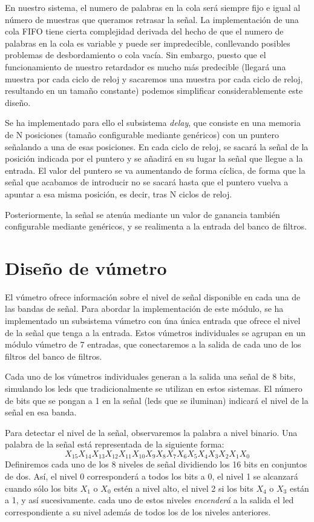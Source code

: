 \documentclass[a4paper,12pt]{article}
\begin{document}
En nuestro sistema, el numero de palabras en la cola será siempre fijo e igual al número de muestras que queramos retrasar la señal. La implementación de una cola FIFO tiene cierta complejidad derivada del hecho de que el numero de palabras en la cola es variable y puede ser impredecible, conllevando posibles problemas de desbordamiento o cola vacía. Sin embargo, puesto que el funcionamiento de nuestro retardador es mucho más predecible (llegará una muestra por cada ciclo de reloj y sacaremos una muestra por cada ciclo de reloj, resultando en un tamaño constante) podemos simplificar considerablemente este diseño.

Se ha implementado para ello el subsistema \emph{delay}, que consiste en una memoria de N posiciones (tamaño configurable mediante genéricos) con un puntero señalando a una de esas posiciones. En cada ciclo de reloj, se sacará la señal de la posición indicada por el puntero y se añadirá en su lugar la señal que llegue a la entrada. El valor del puntero se va aumentando de forma cíclica, de forma que la señal que acabamos de introducir no se sacará hasta que el puntero vuelva a apuntar a esa misma posición, es decir, tras N ciclos de reloj.

Posteriormente, la señal se atenúa mediante un valor de ganancia también configurable mediante genéricos, y se realimenta a la entrada del banco de filtros.

\section{Diseño de vúmetro}
El vúmetro ofrece información sobre el nivel de señal disponible en cada una de las bandas de señal. Para abordar la implementación de este módulo, se ha implementado un subsistema vúmetro con úna única entrada que ofrece el nivel de la señal que tenga a la entrada. Estos vúmetros individuales se agrupan en un módulo vúmetro de 7 entradas, que conectaremos a la salida de cada uno de los filtros del banco de filtros.

Cada uno de los vúmetros individuales generan a la salida una señal de 8 bits, simulando los leds que tradicionalmente se utilizan en estos sistemas. El número de bits que se pongan a 1 en la señal (leds que se iluminan) indicará el nivel de la señal en esa banda.

Para detectar el nivel de la señal, observaremos la palabra a nivel binario. Una palabra de la señal está representada de la siguiente forma:
$$X_{15} X_{14} X_{13} X_{12} X_{11} X_{10} X_{9} X_{8} X_{7} X_{6} X_{5} X_{4} X_{3} X_{2} X_{1} X_{0}$$
Definiremos cada uno de los 8 niveles de señal dividiendo los 16 bits en conjuntos de dos. Así, el nivel 0 corresponderá a todos los bits a 0, el nivel 1 se alcanzará cuando sólo los bits $X_1$ o $X_0$ estén a nivel alto, el nivel 2 si los bits $X_4$ o $X_3$ están a 1, y así sucesivamente. cada uno de estos niveles \emph{encenderá} a la salida el led correspondiente a su nivel además de todos los de los niveles anteriores.
\end{document}
